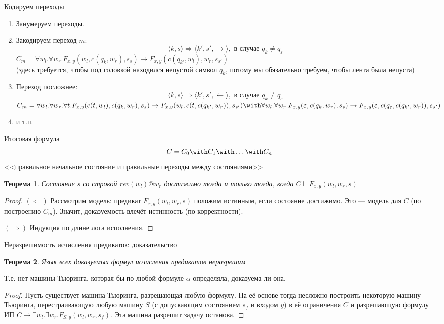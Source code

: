 \documentclass[aspectratio=169]{beamer}
\newtheorem{thm}{Теорема}[section]
\begin{document}
\begin{frame}{Кодируем переходы}
\begin{enumerate}
\item Занумеруем переходы.\pause
\item Закодируем переход $m$: $$\langle k, s \rangle \Rightarrow \langle k', s', \rightarrow \rangle, \text{ в случае } q_k \ne q_\varepsilon$$
$C_m = \forall w_l.\forall w_r.F_{x,y}(w_l,c(q_k,w_r),s_s) \rightarrow F_{x,y}(c(q_{k'},w_l),w_r,s_{s'})$\\
(здесь требуется, чтобы под головкой находился непустой символ $q_k$, потому мы обязательно требуем, чтобы лента была
непуста)\pause

\item Переход посложнее:
$$\langle k, s \rangle \Rightarrow \langle k', s', \leftarrow \rangle, \text{ в случае } q_k \ne q_\varepsilon$$
$C_m = \forall w_l.\forall w_r.\forall t.F_{x,y}(c(t,w_l),c(q_k,w_r),s_s) \rightarrow F_{x,y}(w_l,c(t,c(q_{k'},w_r)),s_{s'}) \with
\forall w_l.\forall w_r.F_{x,y}(\varepsilon,c(q_k,w_r),s_s) \rightarrow F_{x,y}(\varepsilon,c(q_\varepsilon,c(q_{k'},w_r)),s_{s'})$\\
\pause
\item и т.п.
\end{enumerate}
\end{frame}

\begin{frame}{Итоговая формула}
$$C = C_0 \with C_1 \with \dots \with C_n$$
<<правильное начальное состояние и правильные переходы между состояниями>>\pause

\begin{thm}
Состояние $s$ со строкой $rev(w_l)@w_r$ достижимо тогда и только тогда, когда
$C \vdash F_{x,y}(w_l,w_r,s)$\pause
\end{thm}
\begin{proof}
$(\Leftarrow)$ Рассмотрим модель: предикат $F_{x,y}(w_l,w_r,s)$ положим истинным, если состояние достижимо. \pause
Это --- модель для $C$ (по построению $C_m$). \pause
Значит, доказуемость влечёт истинность (по корректности). \pause

$(\Rightarrow)$ Индукция по длине лога исполнения.
\end{proof}
\end{frame}

\begin{frame}{Неразрешимость исчисления предикатов: доказательство}
\begin{thm}Язык всех доказуемых формул исчисления предикатов неразрешим\end{thm}
Т.е. нет машины Тьюринга, которая бы по любой формуле $\alpha$ определяла, доказуема ли она.\pause
\begin{proof} Пусть существует машина Тьюринга, разрешающая любую формулу. \pause%
На её основе тогда несложно построить некоторую машину Тьюринга, перестраивающую любую машину $S$ (с допускающим состоянием $s_f$ и входом $y$) 
в её ограничения $C$ и разрешающую формулу ИП $C \rightarrow \exists w_l.\exists w_r.F_{S,y}(w_l,w_r,s_f)$. 
Эта машина разрешит задачу останова.
\end{proof}
\end{frame}
\end{document}
